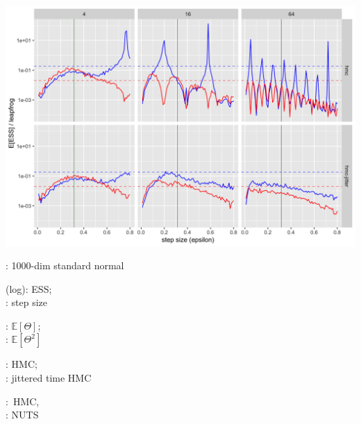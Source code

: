 \documentclass[10pt]{report}
\begin{document}
\begin{minipage}[t]{0.7\textwidth}
  \includegraphics[width=\textwidth]{img/ess-per-leapfrog-jitter-hmc.png}
\end{minipage}%
\begin{minipage}[t]{0.29\textwidth}
  \null\vspace*{-2.5in}
  \begin{subitemize}
  \item {}: 1000-dim standard normal
  \item {} (log):  ESS; \\ : step size
  \item {}: $\mathbb{E}[\Theta]$; \\ :
    $\mathbb{E}[\Theta^2]$
  \item {}: HMC; \\ : jittered time HMC
  \item {}:~HMC,\\ : NUTS
  \end{subitemize}
\end{minipage}
\end{document}
